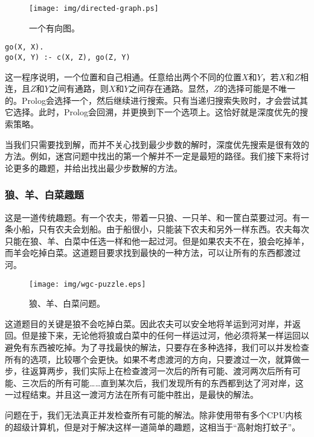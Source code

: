 \documentclass[UTF8]{article}
\begin{document}
\begin{figure}[htbp]
 \centering
 \texttt{[image: img/directed-graph.ps]}
 \caption{一个有向图。}
 \label{fig:directed-graph}
\end{figure}

\lstset{language=Prolog}
\begin{lstlisting}
go(X, X).
go(X, Y) :- c(X, Z), go(Z, Y)
\end{lstlisting}

这一程序说明，一个位置和自己相通。任意给出两个不同的位置$X$和$Y$，若$X$和$Z$相连，且$Z$和$Y$之间有通路，则$X$和$Y$之间存在通路。显然，$Z$的选择可能是不唯一的。Prolog会选择一个，然后继续进行搜索。只有当递归搜索失败时，才会尝试其它选择。此时，Prolog会回溯，并更换到下一个选项上。这恰好就是深度优先的搜索策略。

当我们只需要找到解，而并不关心找到最少步数的解时，深度优先搜索是很有效的方法。例如，迷宫问题中找出的第一个解并不一定是最短的路径。我们接下来将讨论更多的趣题，并给出找出最少步数解的方法。

\subsubsection{狼、羊、白菜趣题}

这是一道传统趣题。有一个农夫，带着一只狼、一只羊、和一筐白菜要过河。有一条小船，只有农夫会划船。由于船很小，只能装下农夫和另外一样东西。农夫每次只能在狼、羊、白菜中任选一样和他一起过河。但是如果农夫不在，狼会吃掉羊，而羊会吃掉白菜。这道题目要求找到最快的一种方法，可以让所有的东西都渡过河。

\begin{figure}[htbp]
 \centering
 \texttt{[image: img/wgc-puzzle.eps]}
 \caption{狼、羊、白菜问题。}
 \label{fig:wgc-puzzle}
\end{figure}

这道题目的关键是狼不会吃掉白菜。因此农夫可以安全地将羊运到河对岸，并返回。但是接下来，无论他将狼或白菜中的任何一样运过河，他必须将某一样运回以避免有东西被吃掉。为了寻找最快的解法，只要存在多种选择，我们可以并发检查所有的选项，比较哪个会更快。如果不考虑渡河的方向，只要渡过一次，就算做一步，往返算两步，我们实际上在检查渡河一次后的所有可能、渡河两次后所有可能、三次后的所有可能……直到某次后，我们发现所有的东西都到达了河对岸，这一过程结束。并且这一渡河方法在所有可能中胜出，是最快的解法。

问题在于，我们无法真正并发检查所有可能的解法。除非使用带有多个CPU内核的超级计算机，但是对于解决这样一道简单的趣题，这相当于“高射炮打蚊子”。
\end{document}
